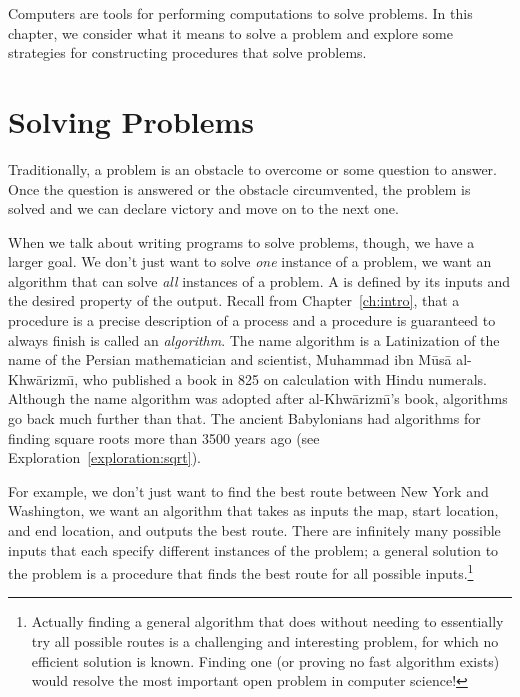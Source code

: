 \begin{schemeregion}

Computers are tools for performing computations to solve problems.  In this chapter, we consider what it means to solve a problem and explore some strategies for constructing procedures that solve problems.

\section{Solving Problems}

Traditionally, a problem is an obstacle to overcome or some question to answer.  Once the question is answered or the obstacle circumvented, the problem is solved and we can declare victory and move on to the next one.  

When we talk about writing programs to solve problems, though, we have a larger goal.  We don't just want to solve \emph{one} instance of a problem, we want an algorithm that can solve \emph{all} instances of a problem.  A  is defined by its inputs and the desired property of the output.  Recall from Chapter~\ref{ch:intro}, that a procedure is a precise description of a process and a procedure is guaranteed to always finish is called an \emph{algorithm}.  The name algorithm is a Latinization of the name of the Persian mathematician and scientist, Muhammad ibn M\={u}s\={a} al-Khw\={a}rizm\={\i}, who published a book in 825 on calculation with Hindu numerals.   %
Although the name algorithm was adopted after al-Khw\={a}rizm\={\i}'s book, algorithms go back much further than that.  The ancient Babylonians had algorithms for finding square roots more than 3500 years ago (see Exploration~\ref{exploration:sqrt}).  

For example, we don't just want to find the best route between New York and Washington, we want an algorithm that takes as inputs the map, start location, and end location, and outputs the best route.  There are infinitely many possible inputs that each specify different instances of the problem; a general solution to the problem is a procedure that finds the best route for all possible inputs.\footnote{Actually finding a general algorithm that does without needing to essentially try all possible routes is a challenging and interesting problem, for which no efficient solution is known.  Finding one (or proving no fast algorithm exists) would resolve the most important open problem in computer science!}


\end{schemeregion}
